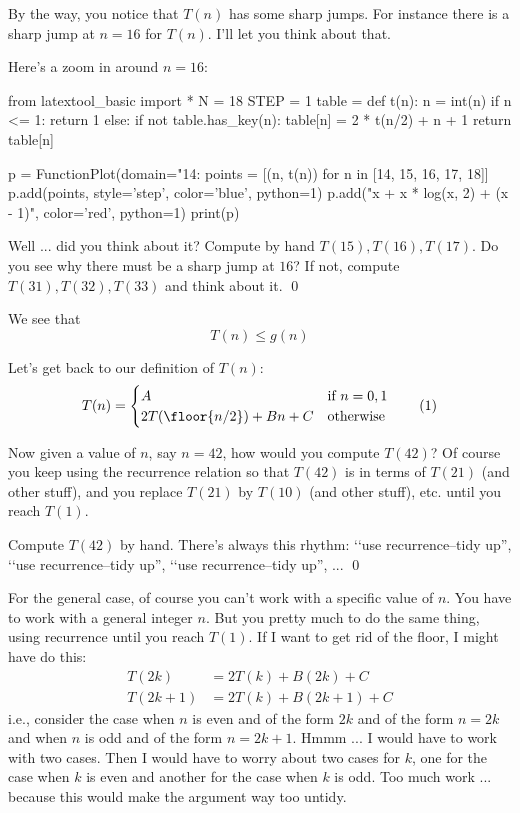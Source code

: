 By the way, you notice that $T(n)$ has some sharp jumps.
For instance there is a sharp jump at $n = 16$
for $T(n)$.
I'll let you think about that.

Here's a zoom in around $n = 16$:
\begin{python}
from latextool_basic import *
N = 18
STEP = 1
table = {}
def t(n):
    n = int(n)
    if n <= 1: return 1
    else:
        if not table.has_key(n):
            table[n] = 2 * t(n/2) + n + 1
        return table[n]

p = FunctionPlot(domain="14:%
points = [(n, t(n)) for n in [14, 15, 16, 17, 18]]
p.add(points, style='step', color='blue', python=1)
p.add("x + x * log(x, 2) + (x - 1)", color='red', python=1)
print(p)
\end{python}

\begin{ex}
Well ... did you think about it?
Compute by hand $T(15), T(16), T(17)$.
Do you see why there must be a sharp jump at $16$?
If not, compute $T(31), T(32), T(33)$ and think about it.
\qed
\end{ex}

We see that 
\[
T(n) \leq g(n)
\]

Let's get back to our definition of $T(n)$:
\[
T(n) 
= 
\begin{cases}
A                        & \text{if $n = 0, 1$} \\
2T(\floor{n/2}) + Bn + C & \text{otherwise}
\end{cases}
\tag{1}
\]

Now given a value of $n$, say $n = 42$, how would you
compute $T(42)$?
Of course you keep using the recurrence relation
so that $T(42)$ is in terms of $T(21)$ (and other stuff),
and you replace $T(21)$ by $T(10)$ (and other stuff), etc.
until you reach $T(1)$.

\begin{ex}
Compute $T(42)$ by hand.
There's always this rhythm: 
\lq\lq use recurrence--tidy up'', 
\lq\lq use recurrence--tidy up'', 
\lq\lq use recurrence--tidy up'', 
...
\qed
\end{ex}

For the general case, of course you can't work with a specific value of $n$.
You have to work with a general integer $n$.
But you pretty much to do the same thing, 
using recurrence until you reach $T(1)$.
If I want to get rid of the floor, I might have do this:
\begin{align*}
T(2k) &= 2T(k) + B(2k) + C \\
T(2k + 1) &= 2T(k) + B(2k + 1) + C 
\end{align*}
i.e., consider the case when $n$ is even and of the form $2k$
and of the form $n = 2k$
and when $n$ is odd and of the form $n = 2k + 1$.
Hmmm ... I would have to work with two cases. 
Then I would have to worry about two cases for $k$, one for the
case when $k$ is even and another for the case when $k$ is odd.
Too much work ... because this would make the argument way too 
untidy.

